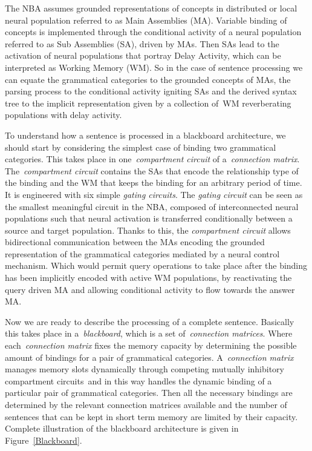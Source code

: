 \documentclass[10pt]{article}
\begin{document}
The NBA assumes grounded representations of concepts in distributed or
local neural population referred to as Main Assemblies (MA). Variable
binding of concepts is implemented through the conditional activity of
a neural population referred to as Sub Assemblies (SA), driven by MAs.
Then SAs lead to the activation of neural populations that portray
Delay Activity\cite{de_Kamps_2005}, which can be interpreted as
Working Memory (WM). So in the case of sentence processing we can
equate the grammatical categories to the grounded concepts of MAs, the
parsing process to the conditional activity igniting SAs and the
derived syntax tree to the implicit representation given by a
collection of~WM reverberating populations with delay activity.

To understand how a sentence is processed in a blackboard
architecture, we should start by considering the simplest case of
binding two grammatical categories. This takes place in
one~\emph{compartment circuit} of a~\emph{connection matrix}.
The~\emph{compartment circuit} contains the SAs that encode the
relationship type of the binding and the WM that keeps the binding for
an arbitrary period of time. It is engineered with six simple
\emph{gating circuits}. The \emph{gating circuit} can be seen as the
smallest meaningful circuit in the NBA, composed of interconnected
neural populations such that neural activation is transferred
conditionally between a source and target population. Thanks to this,
the \emph{compartment circuit} allows bidirectional communication
between the MAs encoding the grounded representation of the
grammatical categories mediated by a neural control mechanism. Which
would permit query operations to take place after the binding has been
implicitly encoded with active WM populations, by reactivating the
query driven MA and allowing conditional activity to flow towards the
answer MA.

Now we are ready to describe the processing of a complete sentence.
Basically this takes place in a~\emph{blackboard}, which is a set
of~\emph{connection matrices}. Where each~\emph{connection matrix}
fixes the memory capacity by determining the possible amount of
bindings for a pair of grammatical categories. A~\emph{connection
  matrix} manages memory slots dynamically through competing mutually
inhibitory compartment circuits~and in this way handles the dynamic
binding of a particular pair of grammatical categories. Then all the
necessary bindings are determined by the relevant connection matrices
available and the number of sentences that can be kept in short term
memory are limited by their capacity. Complete illustration of the
blackboard architecture is given in Figure~{\ref{Blackboard}}.
\end{document}
